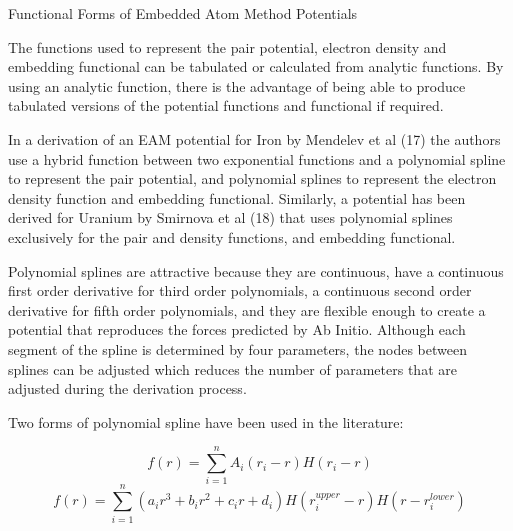 Functional Forms of Embedded Atom Method Potentials

The functions used to represent the pair potential, electron density and embedding functional can be tabulated or calculated from analytic functions.  By using an analytic function, there is the advantage of being able to produce tabulated versions of the potential functions and functional if required.

In a derivation of an EAM potential for Iron by Mendelev et al (17) the authors use a hybrid function between two exponential functions and a polynomial spline to represent the pair potential, and polynomial splines to represent the electron density function and embedding functional.  Similarly, a potential has been derived for Uranium by Smirnova et al (18) that uses polynomial splines exclusively for the pair and density functions, and embedding functional.

Polynomial splines are attractive because they are continuous, have a continuous first order derivative for third order polynomials, a continuous second order derivative for fifth order polynomials, and they are flexible enough to create a potential that reproduces the forces predicted by Ab Initio.  Although each segment of the spline is determined by four parameters, the nodes between splines can be adjusted which reduces the number of parameters that are adjusted during the derivation process.

Two forms of polynomial spline have been used in the literature:

\begin{equation}
f(r) = \sum \limits_{i=1}^{n} A_{i}(r_{i}-r)H(r_{i}-r)
\end{equation}
\begin{equation}
f(r) = \sum \limits_{i=1}^{n} (a_{i}r^{3}+b_{i}r^{2}+c_{i}r+d_{i}) H(r_{i}^{upper}-r)H(r-r_{i}^{lower})
\end{equation}

